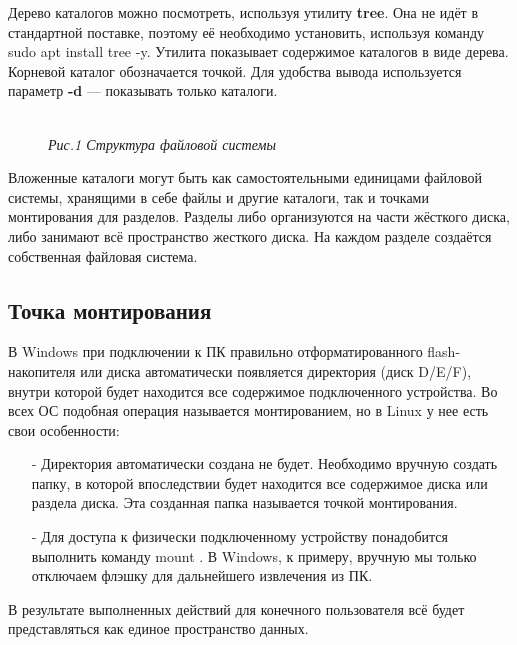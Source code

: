 \documentclass[14pt, a4paper]{article}
\begin{document}
Дерево каталогов можно посмотреть, используя утилиту \textbf{tree}. Она не идёт в стандартной поставке,
поэтому её необходимо установить, используя команду \colorbox{backcolour}{sudo apt install tree -y}. Утилита
показывает содержимое каталогов в виде дерева. Корневой каталог обозначается точкой. Для
удобства вывода используется параметр \textbf{-d} — показывать только каталоги.

\begin{figure}[h]
    \centering
    \\ 
    \small\textit{Рис.1 Структура файловой системы}  
    \label{framework} 
\end{figure}

\newpage

Вложенные каталоги могут быть как самостоятельными единицами файловой системы, хранящими в
себе файлы и другие каталоги, так и точками монтирования для разделов. Разделы либо
организуются на части жёсткого диска, либо занимают всё пространство жесткого диска. На каждом
разделе создаётся собственная файловая система.

\subsection*{Точка монтирования} 

В Windows при подключении к ПК правильно отформатированного flash-накопителя или диска
автоматически появляется директория (диск D/E/F), внутри которой будет находится все содержимое
подключенного устройства. Во всех ОС подобная операция называется монтированием, но в Linux у
нее есть свои особенности:

\begin{itemize}
    \item[-] Директория автоматически создана не будет. Необходимо вручную создать папку, в которой
    впоследствии будет находится все содержимое диска или раздела диска. Эта созданная папка
    называется точкой монтирования.
    \item[-] Для доступа к физически подключенному устройству понадобится выполнить команду mount .
    В Windows, к примеру, вручную мы только отключаем флэшку для дальнейшего извлечения из
    ПК. 
\end{itemize}

В результате выполненных действий для конечного пользователя всё будет представляться как
единое пространство данных.
\end{document}
